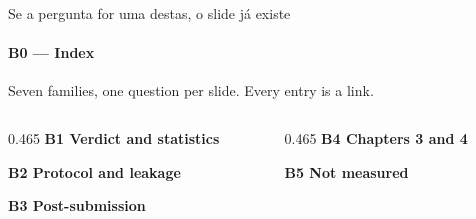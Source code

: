 \documentclass{beamer}
\begin{document}
\begin{frame}[noframenumbering]{Se a pergunta for uma destas, o slide já existe}
    \framesubtitle{B0 --- Index}
    \hypertarget{b0}{}
    \footnotesize
    Seven families, one question per slide. Every entry is a link.
    \smallskip

    \begin{columns}[T,onlytextwidth]
    \begin{column}{0.465\textwidth}
        \textbf{B1 \textbullet{} Verdict and statistics}\\
        \hyperlink{b11}{}\hyperlink{b12}{}\hyperlink{b13}{}\hyperlink{b14}{}\hyperlink{b15}{}\hyperlink{b16}{}
        \smallskip

        \textbf{B2 \textbullet{} Protocol and leakage}\\
        \hyperlink{b21}{}\hyperlink{b22}{}\hyperlink{b23}{}\hyperlink{b24}{}\hyperlink{b25}{}
        \smallskip

        \textbf{B3 \textbullet{} Post-submission}\\
        \hyperlink{bp1}{}\hyperlink{bq13}{}\hyperlink{bq14}{}\hyperlink{bq15}{}\\
        \hyperlink{bnom}{}\hyperlink{bkarpathy}{}\hyperlink{bmtlcheck}{}\hyperlink{bapxg}{}
    \end{column}
    \hfill
    \begin{column}{0.465\textwidth}
        \textbf{B4 \textbullet{} Chapters 3 and 4}\\
        \hyperlink{b4leak}{}\hyperlink{b4dgi}{}\hyperlink{b41}{}\hyperlink{b42}{}\hyperlink{b43}{}\hyperlink{b44}{}\hyperlink{b45}{}
        \smallskip

        \textbf{B5 \textbullet{} Not measured}\\
        \hyperlink{q5}{}\hyperlink{q8}{}\hyperlink{u1}{}\hyperlink{u2}{}\hyperlink{u3}{}\hyperlink{u4}{}\hyperlink{u5}{}\hyperlink{u6}{}\hyperlink{u7}{}\hyperlink{u8}{}
        \smallskip


\end{column}
\end{columns}
\end{frame}
\end{document}
